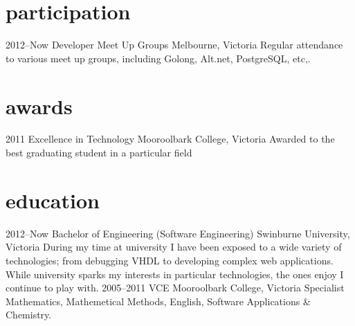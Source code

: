 \documentclass[]{friggeri-cv} %
\begin{document}
\section{participation}

\begin{entrylist}

\entry
{2012--Now}
{Developer Meet Up Groups}
{Melbourne, Victoria}
{Regular attendance to various meet up groups, including Golong, Alt.net,
PostgreSQL, etc,.}

\end{entrylist}

\section{awards}

\begin{entrylist}
\entry
{2011}
{Excellence in Technology}
{Mooroolbark College, Victoria}
{Awarded to the best graduating student in a particular field}
\end{entrylist}

\pagebreak

\section{education}

\begin{entrylist}
\entry
{2012--Now}
{Bachelor {\normalfont of Engineering (Software Engineering)}}
{Swinburne University, Victoria}
{During my time at university I have been exposed to a wide variety of
technologies; from debugging VHDL to developing complex web applications.
While university sparks my interests in particular technologies, the ones enjoy
I continue to play with. }
\entry
{2005--2011}
{VCE {\normalfont}}
{Mooroolbark College, Victoria}
{Specialist Mathematics, Mathemetical Methods, English, Software Applications \& Chemistry.}
\end{entrylist}
\end{document}
